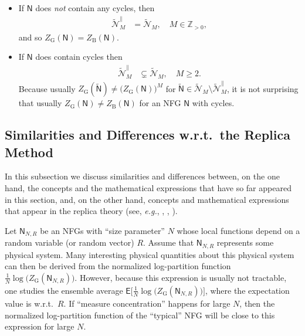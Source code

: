 \documentclass[journal, twocolumn]{IEEEtran}
\newcommand{\eg}{\emph{e.g.}}
\renewcommand{\geq}{\geqslant}
\newcommand{\Z}{\mathbb{Z}}
\newcommand{\Zpp}{\Z_{>0}}
\newcommand{\Expec}{\mathsf{E}}
\newcommand{\set}[1]{\mathcal{#1}}
\newcommand{\graph}[1]{\mathsf{#1}}
\newcommand{\graphN}{\graph{N}}
\newcommand{\ZBethe}{Z_{\mathrm{B}}}
\newcommand{\cover}[1]{\tilde{#1}}
\newcommand{\cset}[1]{\cover{\set{#1}}}
\newcommand{\cgraph}[1]{\cover{\graph{#1}}}
\newcommand{\?}{\mathrm{?}}
\newcommand{\ZGibbs}{Z_{\mathrm{G}}}
\newcommand{\ZGibbsext}[1]{Z_{\mathrm{G}}(#1)}
\begin{document}
\begin{itemize}
\item If $\graphN$ does \emph{not} contain any cycles, then
  \begin{align*}
    \cset{N}^{\parallel}_{M}
    &= \cset{N}_{M},
         \quad M \in \Zpp, 
  \end{align*}
  and so $\ZGibbs(\graphN) = \ZBethe(\graphN)$.

\item If $\graphN$ does contain cycles then
  \begin{align*}
    \cset{N}^{\parallel}_{M}
      &\subsetneq
         \cset{N}_{M},
           \quad M \geq 2.
  \end{align*}
  Because usually $\ZGibbs(\cgraph{N}) \neq \bigl( \ZGibbs(\graphN) \bigr)^M$
  for $\cgraph{N} \in \cset{N}_{M} \setminus \cset{N}^{\parallel}_{M}$, it is
  not surprising that usually $\ZGibbs(\graphN) \neq \ZBethe(\graphN)$ for an
  NFG $\graphN$ with cycles.



\end{itemize}



\subsection{Similarities and Differences w.r.t.\ the Replica Method}
\label{sec:replica:method:1}


In this subsection we discuss similarities and differences between, on the one
hand, the concepts and the mathematical expressions that have so far appeared
in this section, and, on the other hand, concepts and mathematical expressions
that appear in the replica theory (see, \eg,
\cite{Mezard:Parisi:Virasoro:87:1}, \cite[Chapter~8]{Mezard:Montanari:09:1},
\cite[Appendix~I]{Tanaka:02:1}).

Let $\graphN_{N,R}$ be an NFGs with ``size parameter'' $N$ whose local
functions depend on a random variable (or random vector) $R$. Assume that
$\graphN_{N,R}$ represents some physical system. Many interesting physical
quantities about this physical system can then be derived from the normalized
log-partition function $\frac{1}{N} \log \bigl( \ZGibbsext{\graphN_{N,R}}
\bigr)$. However, because this expression is usually not tractable, one
studies the ensemble average $\Expec \bigl[ \frac{1}{N} \log \bigl(
\ZGibbsext{\graphN_{N,R}} \bigr) \bigr]$, where the expectation value is
w.r.t.~$R$. If ``measure concentration'' happens for large $N$, then the
normalized log-partition function of the ``typical'' NFG will be close to this
expression for large $N$.
\end{document}
